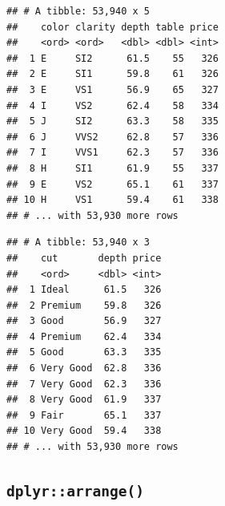\documentclass[]{book}
\newenvironment{Shaded}{\begin{snugshade}}{\end{snugshade}}
\newcommand{\KeywordTok}[1]{\textcolor[rgb]{0.13,0.29,0.53}{\textbf{#1}}}
\newcommand{\NormalTok}[1]{#1}
\newcommand{\OperatorTok}[1]{\textcolor[rgb]{0.81,0.36,0.00}{\textbf{#1}}}
\newcommand{\StringTok}[1]{\textcolor[rgb]{0.31,0.60,0.02}{#1}}
\begin{document}
\begin{Shaded}
\end{Shaded}

\begin{verbatim}
## # A tibble: 53,940 x 5
##    color clarity depth table price
##    <ord> <ord>   <dbl> <dbl> <int>
##  1 E     SI2      61.5    55   326
##  2 E     SI1      59.8    61   326
##  3 E     VS1      56.9    65   327
##  4 I     VS2      62.4    58   334
##  5 J     SI2      63.3    58   335
##  6 J     VVS2     62.8    57   336
##  7 I     VVS1     62.3    57   336
##  8 H     SI1      61.9    55   337
##  9 E     VS2      65.1    61   337
## 10 H     VS1      59.4    61   338
## # ... with 53,930 more rows
\end{verbatim}

\begin{Shaded}
\end{Shaded}

\begin{verbatim}
## # A tibble: 53,940 x 3
##    cut       depth price
##    <ord>     <dbl> <int>
##  1 Ideal      61.5   326
##  2 Premium    59.8   326
##  3 Good       56.9   327
##  4 Premium    62.4   334
##  5 Good       63.3   335
##  6 Very Good  62.8   336
##  7 Very Good  62.3   336
##  8 Very Good  61.9   337
##  9 Fair       65.1   337
## 10 Very Good  59.4   338
## # ... with 53,930 more rows
\end{verbatim}

\hypertarget{dplyrarrange}{%
\subsection{\texorpdfstring{\texttt{dplyr::arrange()}}{dplyr::arrange()}}\label{dplyrarrange}}

\begin{Shaded}
\end{Shaded}
\end{document}
